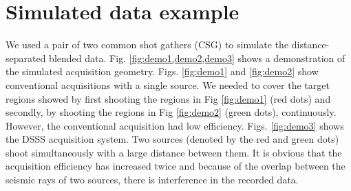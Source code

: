 

\section{Simulated data example}
We used a pair of two common shot gathers (CSG) to simulate the distance-separated blended data. Fig. \ref{fig:demo1,demo2,demo3} shows a demonstration of the simulated acquisition geometry. Figs. \ref{fig:demo1} and \ref{fig:demo2} show conventional acquisitions with a single source. We needed to cover the target regions showed by first shooting the regions in Fig \ref{fig:demo1} (red dots) and secondly, by shooting the regions in Fig \ref{fig:demo2} (green dots), continuously. However,  the conventional acquisition had low efficiency. Figs. \ref{fig:demo3} shows
the DSSS acquisition system. Two sources (denoted by the red and green dots) shoot simultaneously with a large distance between them. It is obvious that the acquisition efficiency has increased twice and because of the overlap between the seismic rays of two sources, there is interference in the recorded data.



